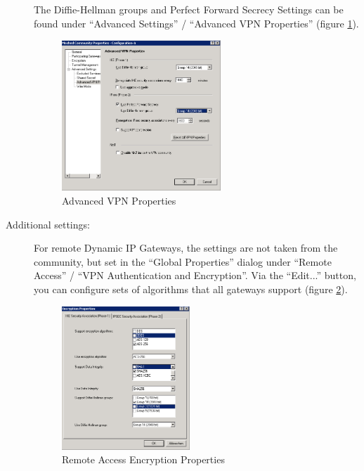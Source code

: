 \begin{description}
The Diffie-Hellman groups and Perfect Forward Secrecy Settings can be
found under ``Advanced Settings'' / ``Advanced VPN Properties''
(figure \ref{fig:checkpoint_3}).

\begin{figure}[p]
  \centering
  \includegraphics[width=0.589\textwidth]{checkpoint_3.png}
  \caption{Advanced VPN Properties}
  \label{fig:checkpoint_3}
\end{figure}

\item[Additional settings:] \mbox{}

For remote Dynamic IP Gateways, the settings are not taken from the
community, but set in the ``Global Properties'' dialog under ``Remote
Access'' / ``VPN Authentication and Encryption''. Via the ``Edit...''
button, you can configure sets of algorithms that all gateways support
(figure \ref{fig:checkpoint_4}).

\begin{figure}[p]
  \centering
  \includegraphics[width=0.474\textwidth]{checkpoint_4.png}
  \caption{Remote Access Encryption Properties}
  \label{fig:checkpoint_4}
\end{figure}


\end{description}
